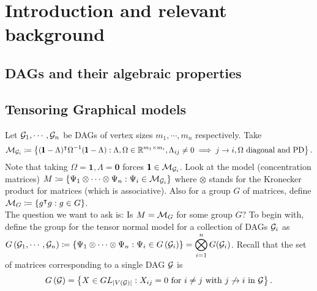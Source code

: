 
\newcommand{\eto}{\stackrel{=}{\to}}
\selectfont 
\usepackage[backend=bibtex]{biblatex}

\title{\vspace{-1cm}}
\usepackage{quiver}
\author{
}
\date{\vspace{-2cm}}



\maketitle

\section{Introduction and relevant background}

\subsection{DAGs and their algebraic properties}



\subsection{Tensoring Graphical models}

Let ${\mathcal{G}}_1, \cdots, {\mathcal{G}}_n$ be DAGs of vertex sizes $m_1,\cdots, m_n$ respectively. Take $${\mathcal{M}}_{\mathcal G_i} \coloneqq \left\{(\pmb1-\Lambda)^\intercal\Omega^{-1}(\pmb1-\Lambda) : \Lambda, \Omega\in \mathbb{R}^{m_1\times m_i}, \Lambda_{ij}\neq 0\implies j\to i, \Omega \text{ diagonal and PD}\right\}.$$ Note that taking $\Omega = \pmb 1, \Lambda=\pmb 0$ forces $\pmb 1\in {\mathcal{M}}_{{\mathcal{G}}_i}$.
Look at the model (concentration matrices) $ M\coloneqq \left\{\Psi_1\otimes\cdots\otimes\Psi_n: \Psi_i\in {\mathcal{M}}_{{\mathcal{G}}_i}\right\}$ where $\otimes$ stands for the Kronecker product for matrices (which is associative). Also for a group $G$ of matrices, define ${\mathcal{M}}_{G} \coloneqq \left\{g^\intercal g: g\in G\right\}$. \\The question we want to ask is: Is $M = {\mathcal{M}}_{G}$ for some group $G$? To begin with, define the group for the tensor normal model for a collection of DAGs ${\mathcal{G}}_i$ as $\displaystyle G\left({\mathcal{G}}_1, \cdots ,{\mathcal{G}}_n\right)\coloneqq \left\{\Psi_1\otimes\cdots\otimes\Psi_n: \Psi_i\in G\left({\mathcal{G}}_i\right)\right\} = \bigotimes_{i=1}^n G({\mathcal{G}}_i)$. Recall that the set of matrices corresponding to a single DAG ${\mathcal{G}}$ is $$G\left({\mathcal{G}}\right) =  \left\{X\in GL_{\left| V({\mathcal{G}}) \right|}: X_{ij} = 0 \text{ for } i\neq j \text{ with } j\not \to i \text{ in }{\mathcal{G}}\right\}.$$

